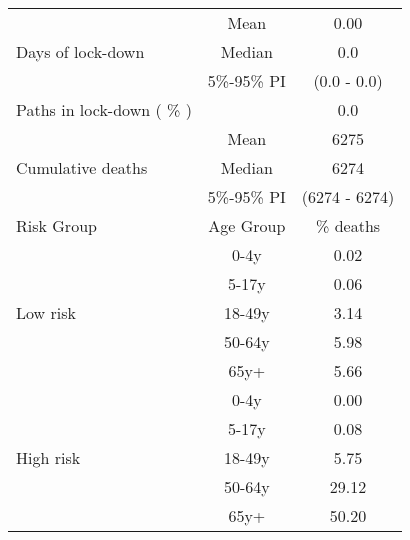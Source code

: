 \documentclass{article}
\begin{document}
\begin{table}[th]
\centering
\begin{tabular}{p{4cm}cc}
\toprule
\multirow{3}{*}{Days   of lock-down} & Mean      & 0.00                        \\ \cmidrule(l){2-3} 
                                     & Median    & 0.0                      \\ \cmidrule(l){2-3} 
                                     & 5\%-95\% PI & (0.0 - 0.0)       \\ \midrule 
\multirow{1}{*}{Paths in lock-down ( \% )} &      &         0.0              \\   \midrule                     
\multirow{3}{\hsize}{Cumulative deaths}       & Mean      & 6275 \\ \cmidrule(l){2-3} 
                                     & Median    & 6274                        \\ \cmidrule(l){2-3} 
                                     & 5\%-95\% PI & (6274 - 6274)           \\  \midrule
Risk Group                           & Age Group & \multicolumn{1}{c}{\% deaths}        \\  \midrule
\multirow{5}{*}{Low   risk}          & 0-4y      & 0.02                         \\ \cmidrule(l){2-3} 
                                     & 5-17y     & 0.06                         \\ \cmidrule(l){2-3} 
                                     & 18-49y    & 3.14                         \\ \cmidrule(l){2-3} 
                                     & 50-64y    & 5.98                         \\ \cmidrule(l){2-3} 
                                     & 65y+      & 5.66                         \\ \midrule
\multirow{5}{*}{High   risk}         & 0-4y      & 0.00                         \\ \cmidrule(l){2-3} 
                                     & 5-17y     & 0.08                         \\ \cmidrule(l){2-3} 
                                     & 18-49y    & 5.75                         \\ \cmidrule(l){2-3} 
                                     & 50-64y    & 29.12                         \\ \cmidrule(l){2-3} 
                                     & 65y+      & 50.20                         \\ \midrule

\end{tabular}
\end{table}
\end{document}
